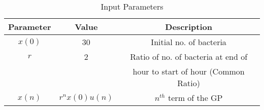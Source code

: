 \begin{table}[h!]
    \centering
    \caption{Input Parameters}
    \label{tab:1}
    \begin{tabular}{ | c | c | c | }
        \hline
        Parameter & Value & Description \\
        \hline
        $x(0)$ & 30 & Initial no. of bacteria\\
        \hline
        $r$ & 2 & Ratio of no. of bacteria at end of \\
        & & hour to start of hour (Common Ratio) \\
        \hline
        $x(n)$ & $r^nx(0)u(n)$ & $n^{th}$ term of the GP \\
        \hline
    \end{tabular}
\end{table}
